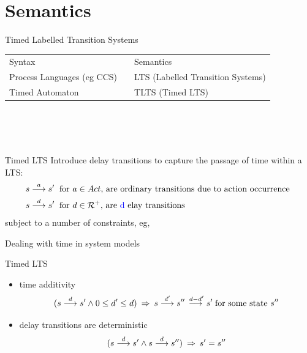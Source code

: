 \documentclass{beamer}
\def\dgold#1{{\darkgoldenrod #1}}
\def\dkb#1{{\blue #1}}
\def\R{\mathcal{R}}
\begin{document}
\section{Semantics}


\begin{slide}{Timed Labelled Transition Systems}
\small
\begin{tabular}{lc@{~~}l}
\toprule 
\dgold{Syntax} && \dgold{Semantics}\\
\cmidrule(lr){1-3}
Process Languages (eg CCS) &  & LTS (Labelled Transition Systems)\\
\dkb{Timed Automaton} &  & TLTS (Timed LTS) \\
\bottomrule
\end{tabular}
~\\
~\\
~\\
\pause

\begin{block}{Timed LTS}
Introduce \dkb{delay transitions} to capture the passage of time within a LTS:
\begin{align*}
s \tran{a} s' & \;\; \text{for $a \in Act$, are ordinary transitions due to action occurrence }\\
s \tran{d} s' &\; \;  \text{for $d \in \R^+$, are \dkb{delay} transitions}
\end{align*}
subject to a number of constraints, eg, 
\end{block}
\end{slide}


\begin{slide}{Dealing with time in system models}
\small
\begin{block}{Timed LTS}
\begin{itemize}
\item \dkb{time additivity}
\begin{equation*}
(s \stackrel{d}{\longrightarrow} s'  \mathbin{\wedge} 0 \leq d' \leq d)\; \mathbin{\Rightarrow}\; s  \stackrel{d'}{\longrightarrow} s'' \stackrel{\; d-d'}{\longrightarrow} s' \; \text{for some state $s''$}
\end{equation*}
\item delay transitions are \dkb{deterministic}
\begin{equation*}
(s \stackrel{d}{\longrightarrow} s'  \mathbin{\wedge} s \stackrel{d}{\longrightarrow} s'')\; \mathbin{\Rightarrow}\; s'  = s''
\end{equation*}
\end{itemize}
\end{block}
\end{slide}
\end{document}
